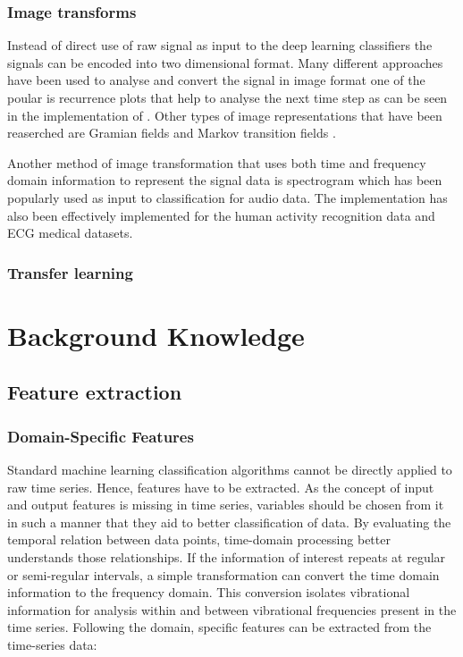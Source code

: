      
      \subsection{Image transforms}
      Instead of direct use of raw signal as input to the deep learning classifiers the signals can be encoded into two dimensional format. Many different approaches have been used to analyse and convert the signal in image format one of the poular is recurrence plots that help to analyse the next time step as can be seen in the implementation of \cite{thanaraj2020implementation}. Other types of image representations that have been reaserched are Gramian fields and  Markov transition fields \cite{wang2015imaging}.
      
      Another method of image transformation that uses both time and frequency domain information to represent the signal data is spectrogram which has been popularly used as input to classification for audio data. The implementation has also been effectively implemented for the human activity recognition data and ECG medical datasets.
      

   \subsection{Transfer learning}
  
  
  
  
  
  
  
  
    
    \chapter{Background Knowledge}
     \section{Feature extraction}
  
        \subsection{Domain-Specific Features}
     Standard machine learning classification algorithms cannot be directly applied to raw time series. Hence, features have to be extracted. As the concept of input and output features is missing in time series, variables should be chosen from it in such a manner that they aid to better classification of data. By evaluating the temporal relation between data points, time-domain processing better understands those relationships. If the information of interest repeats at regular or semi-regular intervals, a simple transformation can convert the time domain information to the frequency domain. This conversion isolates vibrational information for analysis within and between vibrational frequencies present in the time series. Following the domain, specific features can be extracted from the time-series data:
        
